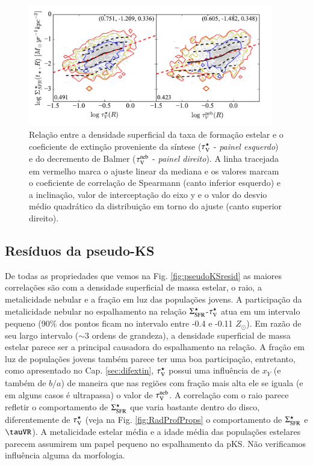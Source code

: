 \begin{figure}
	\centering
	\includegraphics[width=0.95\textwidth]{figuras/pseudoKS.pdf}
	\caption[Nossa {\em pseudo-KS}.]
	{Relação entre a densidade superficial da taxa de formação estelar e o coeficiente de extinção
proveniente da síntese ($\tau_{\mathrm{V}}^\star$ - {\em painel esquerdo}) e do decremento de Balmer ($\tau_{\mathrm{V}}^{\mathrm{neb}}$ -
{\em painel direito}). A linha tracejada em vermelho marca o ajuste linear da mediana e os
valores marcam o coeficiente de correlação de Spearmann (canto inferior esquerdo) e a
inclinação, valor de interceptação do eixo y e o valor do desvio médio quadrático da distribuição em
torno do ajuste (canto superior direito).}
	\label{fig:pseudoKS}
\end{figure}

\subsection{Resíduos da pseudo-KS}
\label{sec:gasfrac:KS:resid}
 
De todas as propriedades que vemos na Fig. \ref{fig:pseudoKSresid} as maiores correlações são com a
densidade superficial de massa estelar, o raio, a metalicidade nebular e a fração em luz das
populações jovens. A participação da metalicidade nebular no espalhamento na relação
$\Sigma_{\mathrm{SFR}}^\star$-$\tau_{\mathrm{V}}^\star$ atua em um intervalo pequeno (90\% dos pontos ficam no intervalo entre -0.4 e
-0.11 $Z_\odot$). Em razão de seu largo intervalo ($\sim 3$ ordens de grandeza), a densidade
superficial de massa estelar parece ser a principal causadora do espalhamento na relação. A fração
em luz de populações jovens também parece ter uma boa participação, entretanto, como apresentado no
Cap. \ref{sec:difextin}, $\tau_{\mathrm{V}}^\star$ possui uma influência de $x_Y$ (e também de $b/a$) de maneira que
nas regiões com fração mais alta ele se iguala (e em alguns casos é ultrapassa) o valor de $\tau_{\mathrm{V}}^{\mathrm{neb}}$.
A correlação com o raio parece refletir o comportamento de $\Sigma_{\mathrm{SFR}}^\star$ que varia bastante dentro do
disco, diferentemente de $\tau_{\mathrm{V}}^\star$ (veja na Fig. \ref{fig:RadProfProps} o comportamento de
$\Sigma_{\mathrm{SFR}}^\star$ e $\tauVR$). A metalicidade estelar média e a idade média das populações estelares
parecem assumirem um papel pequeno no espalhamento da pKS. Não verificamos influência alguma da
morfologia.

